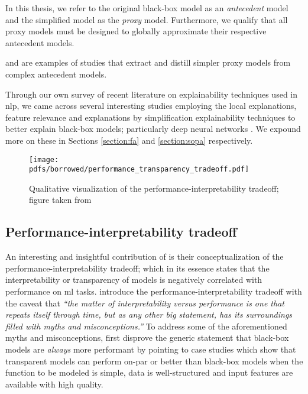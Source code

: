 \begin{remark}
  In this thesis, we refer to the original black-box model as an
  \textit{antecedent} model and the simplified model as the \textit{proxy}
  model. Furthermore, we qualify that all proxy models must be designed to
  globally approximate their respective antecedent models.
\end{remark}

\begin{remark}
  \citet{bastani2017interpretability} and \citet{tan2018distill} are examples of
  studies that extract and distill simpler proxy models from complex antecedent
  models.
\end{remark}

Through our own survey of recent literature on explainability techniques used in
\ac{nlp}, we came across several interesting studies employing the local
explanations, feature relevance and explanations by simplification
explainability techniques to better explain black-box models; particularly deep
neural networks
\citep{schwartz2018sopa,peng2018rational,suresh-etal-2019-distilling,wang2019state,jiang2020cold}.
We expound more on these in Sections \ref{section:fa} and \ref{section:sopa}
respectively.

\begin{figure}[t]
  \centering
  \texttt{[image: pdfs/borrowed/performance\_transparency\_tradeoff.pdf]}
  \caption{Qualitative visualization of the performance-interpretability tradeoff;
    figure taken from \citet{arrieta2020explainable}}
  \label{fig:performance_interpretability_tradeoff}
\end{figure}

\subsection{Performance-interpretability tradeoff}

\label{section:performance_interpretability_tradeoff}

An interesting and insightful contribution of \citet{arrieta2020explainable} is
their conceptualization of the performance-interpretability tradeoff; which in
its essence states that the interpretability or transparency of models is
negatively correlated with performance on \ac{ml} tasks. \citet[Page 18, Section
5.1]{arrieta2020explainable} introduce the performance-interpretability tradeoff
with the caveat that \textit{``the matter of interpretability versus performance
  is one that repeats itself through time, but as any other big statement, has
  its surroundings filled with myths and misconceptions.''} To address some of
the aforementioned myths and misconceptions, \citet{arrieta2020explainable}
first disprove the generic statement that black-box models are
\textit{always} more performant by pointing to case studies which show that
transparent models can perform on-par or better than black-box models when the
function to be modeled is simple, data is well-structured and input
features are available with high quality.

